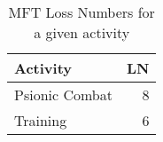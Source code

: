 \begin{table}[h]
\centering
\caption{MFT Loss Numbers for a given activity}
	\begin{tabular}{||l|r||} \hline
	Activity		&	LN	\\ \hline	
	Psionic Combat	&	8	\\
	Training		&	6	\\  \hline
	\end{tabular}
\end{table}
